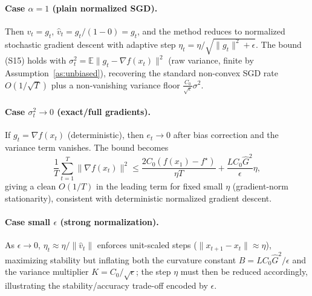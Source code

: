 \documentclass[11pt]{article}
\begin{document}
\paragraph{Case $\alpha=1$ (plain normalized SGD).}
Then $v_t=g_t$, $\hat v_t = g_t/(1-0)=g_t$, and the method reduces to normalized stochastic
gradient descent with adaptive step $\eta_t=\eta/\sqrt{\|g_t\|^2+\epsilon}$. The bound (S15)
holds with $\sigma_t^2 = \mathbb{E}\|g_t-\nabla f(x_t)\|^2$ (raw variance, finite by
Assumption~\ref{as:unbiased}), recovering the standard non-convex SGD rate $O(1/\sqrt T)$
plus a non-vanishing variance floor $\tfrac{C_0}{\sqrt\epsilon}\sigma^2$.

\paragraph{Case $\sigma_t^2 \to 0$ (exact/full gradients).}
If $g_t=\nabla f(x_t)$ (deterministic), then $e_t \to 0$ after bias correction and the
variance term vanishes. The bound becomes
\[
\frac{1}{T}\sum_{t=1}^T \|\nabla f(x_t)\|^2
\le \frac{2C_0(f(x_1)-f^\star)}{\eta T} + \frac{L C_0 \hat G^2}{\epsilon}\eta,
\]
giving a clean $O(1/T)$ in the leading term for fixed small $\eta$ (gradient-norm
stationarity), consistent with deterministic normalized gradient descent.

\paragraph{Case small $\epsilon$ (strong normalization).}
As $\epsilon\to 0$, $\eta_t \approx \eta/\|\hat v_t\|$ enforces unit-scaled steps
($\|x_{t+1}-x_t\|\approx\eta$), maximizing stability but inflating both the curvature constant
$B=LC_0\hat G^2/\epsilon$ and the variance multiplier $K=C_0/\sqrt{\epsilon}$; the step $\eta$
must then be reduced accordingly, illustrating the stability/accuracy trade-off encoded by
$\epsilon$.
\end{document}
